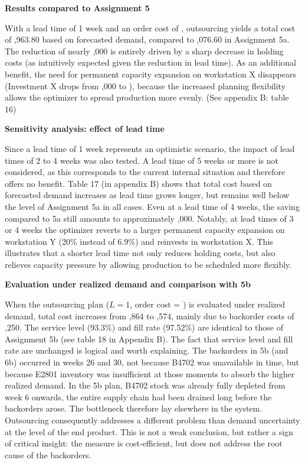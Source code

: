 \documentclass[a4paper,faculty=eb,language=en,doctype=article,sftitles=false]{ugent-doc}
\begin{document}
\vspace{0.5em}
\textbf{Results compared to Assignment 5}

With a lead time of 1 week and an order cost of , outsourcing yields a total cost of ,963.80 based on forecasted demand, compared to ,076.60 in Assignment 5a. The reduction of nearly ,000 is entirely driven by a sharp decrease in holding costs (as intuitively expected given the reduction in lead time). As an additional benefit, the need for permanent capacity expansion on workstation X disappears (Investment X drops from ,000 to ), because the increased planning flexibility allows the optimizer to spread production more evenly. (See appendix B: table 16)

\vspace{0.5em}
\textbf{Sensitivity analysis: effect of lead time}

Since a lead time of 1 week represents an optimistic scenario, the impact of lead times of 2 to 4 weeks was also tested. A lead time of 5 weeks or more is not considered, as this corresponds to the current internal situation and therefore offers no benefit. Table 17 (in appendix B) shows that total cost based on forecasted demand increases as lead time grows longer, but remains well below the level of Assignment 5a in all cases. Even at a lead time of 4 weeks, the saving compared to 5a still amounts to approximately ,000. Notably, at lead times of 3 or 4 weeks the optimizer reverts to a larger permanent capacity expansion on workstation Y (20\% instead of 6.9\%) and reinvests in workstation X. This illustrates that a shorter lead time not only reduces holding costs, but also relieves capacity pressure by allowing production to be scheduled more flexibly.

\vspace{0.5em}
\textbf{Evaluation under realized demand and comparison with 5b}

When the outsourcing plan ($L = 1$, order cost = ) is evaluated under realized demand, total cost increases from ,864 to ,574, mainly due to backorder costs of ,250. The service level (93.3\%) and fill rate (97.52\%) are identical to those of Assignment 5b (see table 18 in Appendix B). The fact that service level and fill rate are unchanged is logical and worth explaining. The backorders in 5b (and 6b) occurred in weeks 26 and 30, not because B4702 was unavailable in time, but because E2801 inventory was insufficient at those moments to absorb the higher realized demand. In the 5b plan, B4702 stock was already fully depleted from week 6 onwards, the entire supply chain had been drained long before the backorders arose. The bottleneck therefore lay elsewhere in the system. Outsourcing consequently addresses a different problem than demand uncertainty at the level of the end product. This is not a weak conclusion, but rather a sign of critical insight: the measure is cost-efficient, but does not address the root cause of the backorders.
\end{document}
